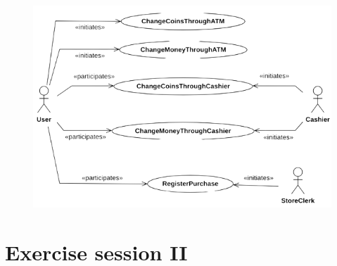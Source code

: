 \documentclass[12pt, a4paper]{report}
\newtheorem[style=M,bodystyle=\normalfont]{theorem}{Theorem}
\newtheorem[style=M,bodystyle=\normalfont]{corollary}{Corollary}
\newtheorem[style=M,bodystyle=\normalfont]{lemma}{Lemma}
\newtheorem[style=M,bodystyle=\normalfont]{definition}{Definition}
\begin{document}
\begin{enumerate}
                \begin{figure}[H]
                    \centering
                    \includegraphics[width=0.9\linewidth]{images/usecase2.png}
                \end{figure}
        \end{enumerate}
    
    \newpage

    \chapter{Exercise session II}
\end{document}

